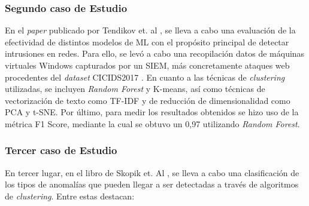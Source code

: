 \subsubsection*{Segundo caso de Estudio}

En el \textit{paper} publicado por Tendikov et. al \cite{TENDIKOV2024102254}, se lleva a cabo una evaluación de la efectividad de distintos modelos de \gls{ML} con el propósito principal de detectar intrusiones en redes. Para ello, se levó a cabo una recopilación datos de máquinas virtuales Windows capturados por un \gls{SIEM}, más concretamente ataques web procedentes del \textit{dataset} CICIDS2017 \cite{sharafaldin2018toward}. En cuanto a las técnicas de \textit{clustering} utilizadas, se incluyen \textit{Random Forest} y K-means, así como técnicas de vectorización de texto como \gls{TF}-\gls{IDF} y de reducción de dimensionalidad como \gls{PCA} y \gls{t-SNE}. Por último, para medir los resultados obtenidos se hizo uso de la métrica F1 Score, mediante la cual se obtuvo un 0,97 utilizando \textit{Random Forest}.

\newpage


\subsubsection*{Tercer caso de Estudio}
En tercer lugar, en el libro de Skopik et. Al \cite{skopik2021smart}, se lleva a cabo una clasificación de los tipos de anomalías que pueden llegar a ser detectadas a través de algoritmos de \textit{clustering}. Entre estas destacan:

